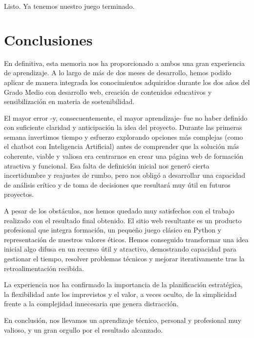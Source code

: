 \documentclass[11.5pt]{article}
\begin{document}
	Listo. Ya tenemos nuestro juego terminado.
	
	\section{Conclusiones}
	
	En definitiva, esta memoria nos ha proporcionado a ambos una gran experiencia de aprendizaje. A lo largo de más de dos meses de desarrollo, hemos podido aplicar de manera integrada los conocimientos adquiridos durante los dos años del Grado Medio con desarrollo web, creación de contenidos educativos y sensibilización en materia de sostenibilidad.
	
	El mayor error -y, consecuentemente, el mayor aprendizaje- fue no haber definido con suficiente claridad y anticipación la idea del proyecto. Durante las primeras semana invertimos tiempo y esfuerzo explorando opciones más complejas (como el chatbot con Inteligencia Artificial) antes de comprender que la solución más coherente, viable y valiosa era centrarnos en crear una página web de formación atractiva y funcional. Esa falta de definición inicial nos generó cierta incertidumbre y reajustes de rumbo, pero nos obligó a desarrollar una capacidad de análisis crítico y de toma de decisiones que resultará muy útil en futuros proyectos.

	A pesar de los obstáculos, nos hemos quedado muy satisfechos con el trabajo realizado con el resultado final obtenido. El sitio web resultante es un producto profesional que integra formación, un pequeño juego clásico en Python y representación de nuestros valores éticos. Hemos conseguido transformar una idea inicial algo difusa en un recurso útil y atractivo, demostrando capacidad para gestionar el tiempo, resolver problemas técnicos y mejorar iterativamente tras la retroalimentación recibida.
	
	La experiencia nos ha confirmado la importancia de la planificación estratégica, la flexibilidad ante los imprevistos y el valor, a veces oculto, de la simplicidad frente a la complejidad innecesaria que genera distracción.
	
	En conclusión, nos llevamos un aprendizaje técnico, personal y profesional muy valioso, y un gran orgullo por el resultado alcanzado.
\end{document}
